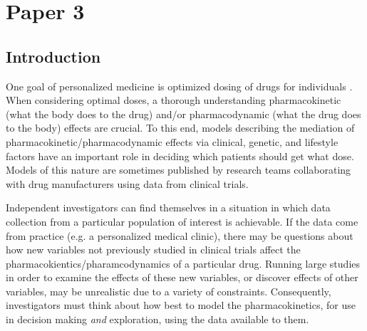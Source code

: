 \chapter{Paper 3}


\section{Introduction}

One goal of personalized medicine is optimized dosing of drugs for individuals \cite{morse2015personalized}.  When considering optimal doses, a thorough understanding pharmacokinetic (what the body does to the drug) and/or pharmacodynamic (what the drug does to the body) effects are crucial.  To this end, models describing the mediation of pharmacokinetic/pharmacodynamic effects via clinical, genetic, and lifestyle factors have an important role in deciding which patients should get what dose. Models of this nature are sometimes published by research teams collaborating with drug manufacturers using data from clinical trials.

Independent investigators can find themselves in a situation in which data collection from a particular population of interest is achievable. If the data come from practice (e.g. a personalized medical clinic), there may be questions about how new variables not previously studied in clinical trials affect the pharmacokientics/pharamcodynamics of a particular drug.  Running large studies in order to examine the effects of these new variables, or discover effects of other variables, may be unrealistic due to a variety of constraints.  Consequently, investigators must think about how best to model the pharmacokinetics, for use in decision making \textit{and} exploration, using the data available to them.

